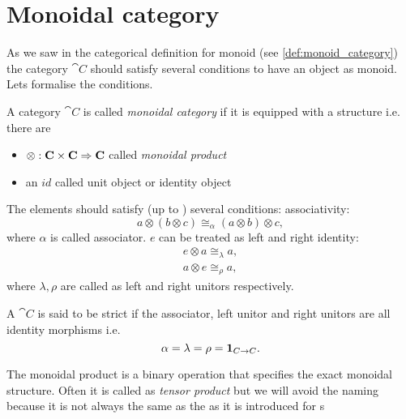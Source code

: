 \section{Monoidal category}
As we saw in the categorical definition for monoid (see
\cref{def:monoid_category}) the category $\cat{C}$ should satisfy
several conditions to have an object as monoid. Lets formalise the conditions.
\begin{definition}
\label{def:monoidal_category}
A category $\cat{C}$ is called \textit{monoidal category} if it is
equipped with a  structure i.e. there are
\begin{itemize}
\item {} $\otimes: \mathbf{C} \times \mathbf{C} \Rightarrow
  \mathbf{C}$ called \textit{monoidal product}  
\item an  $id$ called unit object or identity object
\end{itemize}

The elements should satisfy (up to ) several conditions:
associativity: 
\begin{equation}
a \otimes \left( b \otimes c \right) \cong_\alpha
  \left( a \otimes b \right) \otimes c,
\nonumber
\end{equation}
where $\alpha$ is called associator. 
$e$ can be treated as left and right identity: 
\begin{eqnarray}
e \otimes a \cong_\lambda a, 
\nonumber \\
a \otimes e \cong_\rho a,
\nonumber
\end{eqnarray}
where $\lambda, \rho$ are called as left and right unitors respectively.  
\end{definition}


\begin{definition}
\label{def:strict_monoidal_category}
A  $\cat{C}$ is said to be strict if the
associator, left 
unitor and right unitors are all identity morphisms i.e.
\[
\alpha = \lambda = \rho = \mathbf{1}_{ C \to C }.
\]
 
\end{definition}

\begin{remark}
\label{rem:monoidal_product}
The monoidal product is a binary operation that specifies the exact
monoidal structure. Often it is called as \textit{tensor product} but
we will avoid the naming because it is not always the same as the
 as it is introduced for
s  
\end{remark}

